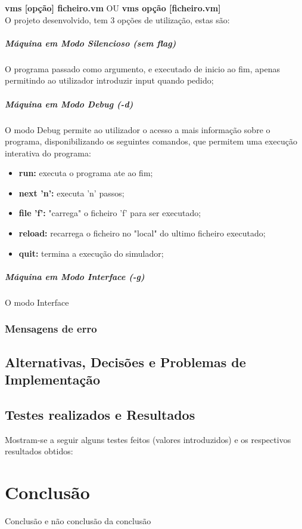 \documentclass{report}
\begin{document}
\quad \textbf{vms [opção] ficheiro.vm} OU \textbf{vms opção [ficheiro.vm]}\\

O projeto desenvolvido, tem 3 opções de utilização, estas são:
\paragraph{\quad Máquina em Modo Silencioso (sem flag)}
	O programa passado como argumento, e executado de inicio ao fim, apenas permitindo ao utilizador introduzir input quando pedido;
\paragraph{\quad Máquina em Modo Debug (-d)}
	O modo Debug permite ao utilizador o acesso a mais informação sobre o programa, disponibilizando
  os seguintes comandos, que permitem uma execução interativa do programa:
\begin{itemize}
	\item \textbf{run:} executa o programa ate ao fim;
	\item \textbf{next 'n':} executa 'n' passos;
	\item \textbf{file 'f':} "carrega" o ficheiro 'f' para ser executado;
	\item \textbf{reload:} recarrega o ficheiro no "local" do ultimo ficheiro executado;
	\item \textbf{quit:} termina a execução do simulador;
\end{itemize}
\paragraph{\quad Máquina em Modo Interface (-g)}
  O modo Interface
\subsection{Mensagens de erro}
\section{Alternativas, Decisões e Problemas de Implementação}
\section{Testes realizados e Resultados}
Mostram-se a seguir alguns testes feitos (valores introduzidos) e
os respectivos resultados obtidos:

\chapter{Conclusão} \label{concl}
Conclusão e não conclusão da conclusão



\end{document}
